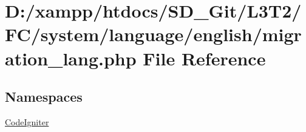 \hypertarget{migration__lang_8php}{}\section{D\+:/xampp/htdocs/\+S\+D\+\_\+\+Git/\+L3\+T2/\+F\+C/system/language/english/migration\+\_\+lang.php File Reference}
\label{migration__lang_8php}
\subsection*{Namespaces}
\begin{DoxyCompactItemize}
\item 
 \hyperlink{namespace_code_igniter}{Code\+Igniter}
\end{DoxyCompactItemize}

